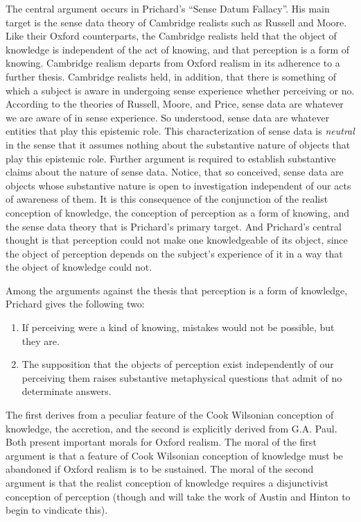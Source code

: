 The central argument occurs in Prichard's \citeyearpar{Prichard:1938ve} ``Sense Datum Fallacy''. His main target is the sense data theory of Cambridge realists such as Russell and Moore. Like their Oxford counterparts, the Cambridge realists held that the object of knowledge is independent of the act of knowing, and that perception is a form of knowing. Cambridge realism departs from Oxford realism in its adherence to a further thesis. Cambridge realists held, in addition, that there is something of which a subject is aware in undergoing sense experience whether perceiving or no. According to the theories of Russell, Moore, and Price, sense data are whatever we are aware of in sense experience. So understood, sense data are whatever entities that play this epistemic role. This characterization of sense data is \emph{neutral} in the sense that it assumes nothing about the substantive nature of objects that play this epistemic role. Further argument is required to establish substantive claims about the nature of sense data. Notice, that so conceived, sense data are objects whose substantive nature is open to investigation independent of our acts of awareness of them. It is this consequence of the conjunction of the realist conception of knowledge, the conception of perception as a form of knowing, and the sense data theory that is Prichard's primary target. And Prichard's central thought is that perception could not make one knowledgeable of its object, since the object of perception depends on the subject's experience of it in a way that the object of knowledge could not.

Among the arguments against the thesis that perception is a form of knowledge, Prichard gives the following two:
\begin{enumerate}
	\item If perceiving were a kind of knowing, mistakes would not be possible, but they are.
	\item The supposition that the objects of perception exist independently of our perceiving them raises substantive metaphysical questions that admit of no determinate answers.
\end{enumerate}
The first derives from a peculiar feature of the Cook Wilsonian conception of knowledge, the accretion, and the second is explicitly derived from G.A. Paul. Both present important morals for Oxford realism. The moral of the first argument is that a feature of Cook Wilsonian conception of knowledge must be abandoned if Oxford realism is to be sustained. The moral of the second argument is that the realist conception of knowledge requires a disjunctivist conception of perception (though and will take the work of Austin and Hinton to begin to vindicate this).


